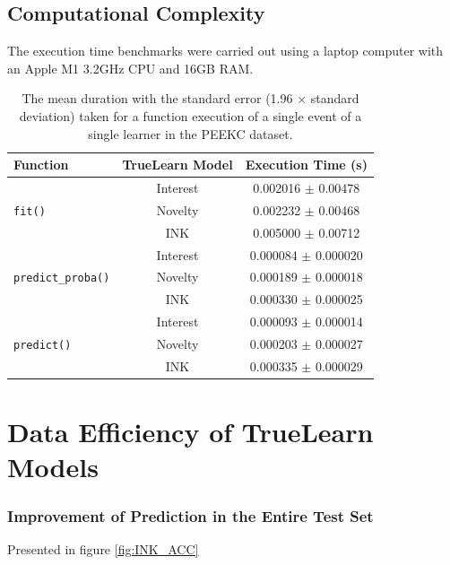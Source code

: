 \documentclass[letterpaper]{article} %
\begin{document}
\subsection{Computational Complexity}

The execution time benchmarks were carried out using a laptop computer with an Apple M1 3.2GHz CPU and 16GB RAM.

\begin{table}[h!] \footnotesize
\caption{The mean duration with the standard error (1.96 $\times$ standard deviation) taken for a function execution of a single event of a single learner in the PEEKC dataset.} 
\centering 
\begin{tabular}{l c c}
  \hline
  Function & TrueLearn Model & Execution Time (s) \\
  \hline
  & Interest & 0.002016 $\pm$ 0.00478
  \\
  \texttt{fit()} & Novelty & 0.002232 $\pm$ 0.00468 \\
   & INK & 0.005000 $\pm$ 0.00712 \\
   \hline
  & Interest & 0.000084 $\pm$ 0.000020   \\
  \texttt{predict\_proba()} & Novelty & 0.000189 $\pm$ 0.000018 \\
   & INK & 0.000330 $\pm$ 0.000025 \\
   \hline
    & Interest & 0.000093 $\pm$  0.000014 \\
  \texttt{predict()} & Novelty & 0.000203 $\pm$  0.000027 \\
   & INK & 0.000335 $\pm$  0.000029  \\
   \hline
\end{tabular}
\end{table}

\newpage
\section{Data Efficiency of TrueLearn Models}


\subsubsection{Improvement of Prediction in the Entire Test Set}

Presented in figure \ref{fig:INK_ACC}
\end{document}

